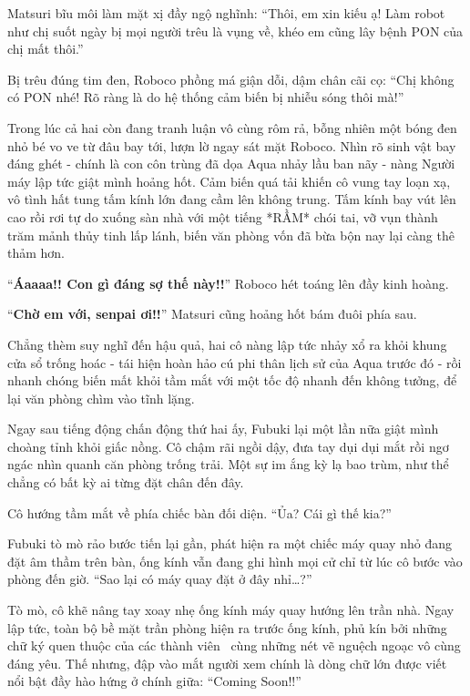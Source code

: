 \documentclass[../main.tex]{subfiles}
\begin{document}
Matsuri bĩu môi làm mặt xị đầy ngộ nghĩnh: ``Thôi, em xin kiếu ạ! Làm robot như chị suốt ngày bị mọi người trêu là vụng về, khéo em cũng lây bệnh PON của chị mất thôi.''

Bị trêu đúng tim đen, Roboco phồng má giận dỗi, dậm chân cãi cọ: ``Chị không có PON nhé! Rõ ràng là do hệ thống cảm biến bị nhiễu sóng thôi mà!''

Trong lúc cả hai còn đang tranh luận vô cùng rôm rả, bỗng nhiên một bóng đen nhỏ bé vo ve từ đâu bay tới, lượn lờ ngay sát mặt Roboco. Nhìn rõ sinh vật bay đáng ghét - chính là con côn trùng đã dọa Aqua nhảy lầu ban nãy - nàng Người máy lập tức giật mình hoảng hốt. Cảm biến quá tải khiến cô vung tay loạn xạ, vô tình hất tung tấm kính lớn đang cầm lên không trung. Tấm kính bay vút lên cao rồi rơi tự do xuống sàn nhà với một tiếng *RẦM* chói tai, vỡ vụn thành trăm mảnh thủy tinh lấp lánh, biến văn phòng vốn đã bừa bộn nay lại càng thê thảm hơn.


``\textbf{Áaaaa!! Con gì đáng sợ thế này!!}'' Roboco hét toáng lên đầy kinh hoàng.

``\textbf{Chờ em với, senpai ơi!!}'' Matsuri cũng hoảng hốt bám đuôi phía sau.

Chẳng thèm suy nghĩ đến hậu quả, hai cô nàng lập tức nhảy xổ ra khỏi khung cửa sổ trống hoác - tái hiện hoàn hảo cú phi thân lịch sử của Aqua trước đó - rồi nhanh chóng biến mất khỏi tầm mắt với một tốc độ nhanh đến không tưởng, để lại văn phòng chìm vào tĩnh lặng.

Ngay sau tiếng động chấn động thứ hai ấy, Fubuki lại một lần nữa giật mình choàng tỉnh khỏi giấc nồng. Cô chậm rãi ngồi dậy, đưa tay dụi dụi mắt rồi ngơ ngác nhìn quanh căn phòng trống trải. Một sự im ắng kỳ lạ bao trùm, như thể chẳng có bất kỳ ai từng đặt chân đến đây.


Cô hướng tầm mắt về phía chiếc bàn đối diện. ``Ủa? Cái gì thế kia?''

Fubuki tò mò rảo bước tiến lại gần, phát hiện ra một chiếc máy quay nhỏ đang đặt âm thầm trên bàn, ống kính vẫn đang ghi hình mọi cử chỉ từ lúc cô bước vào phòng đến giờ. ``Sao lại có máy quay đặt ở đây nhỉ\dots?''

Tò mò, cô khẽ nâng tay xoay nhẹ ống kính máy quay hướng lên trần nhà. Ngay lập tức, toàn bộ bề mặt trần phòng hiện ra trước ống kính, phủ kín bởi những chữ ký quen thuộc của các thành viên \hll\ cùng những nét vẽ nguệch ngoạc vô cùng đáng yêu. Thế nhưng, đập vào mắt người xem chính là dòng chữ lớn được viết nổi bật đầy hào hứng ở chính giữa: ``Coming Soon!!''
\end{document}
